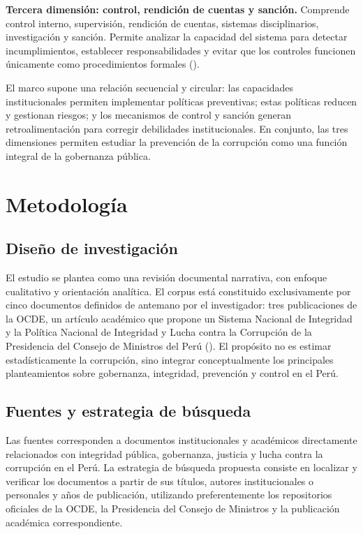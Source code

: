 \documentclass[Afour,sageh,times]{sagej}
\begin{document}
\textbf{Tercera dimensión: control, rendición de cuentas y sanción.} Comprende control interno, supervisión, rendición de cuentas, sistemas disciplinarios, investigación y sanción. Permite analizar la capacidad del sistema para detectar incumplimientos, establecer responsabilidades y evitar que los controles funcionen únicamente como procedimientos formales (\citealp{oecd2017integrity,pcm2017politica}).

El marco supone una relación secuencial y circular: las capacidades institucionales permiten implementar políticas preventivas; estas políticas reducen y gestionan riesgos; y los mecanismos de control y sanción generan retroalimentación para corregir debilidades institucionales. En conjunto, las tres dimensiones permiten estudiar la prevención de la corrupción como una función integral de la gobernanza pública.

\section{Metodología}
\subsection{Diseño de investigación}
El estudio se plantea como una revisión documental narrativa, con enfoque cualitativo y orientación analítica. El corpus está constituido exclusivamente por cinco documentos definidos de antemano por el investigador: tres publicaciones de la OCDE, un artículo académico que propone un Sistema Nacional de Integridad y la Política Nacional de Integridad y Lucha contra la Corrupción de la Presidencia del Consejo de Ministros del Perú (\citealp{oecd2017integrity,oecd2024justice,oecd2024sistema,munive2022integridad,pcm2017politica}). El propósito no es estimar estadísticamente la corrupción, sino integrar conceptualmente los principales planteamientos sobre gobernanza, integridad, prevención y control en el Perú.

\subsection{Fuentes y estrategia de búsqueda}
Las fuentes corresponden a documentos institucionales y académicos directamente relacionados con integridad pública, gobernanza, justicia y lucha contra la corrupción en el Perú. La estrategia de búsqueda propuesta consiste en localizar y verificar los documentos a partir de sus títulos, autores institucionales o personales y años de publicación, utilizando preferentemente los repositorios oficiales de la OCDE, la Presidencia del Consejo de Ministros y la publicación académica correspondiente.
\end{document}

